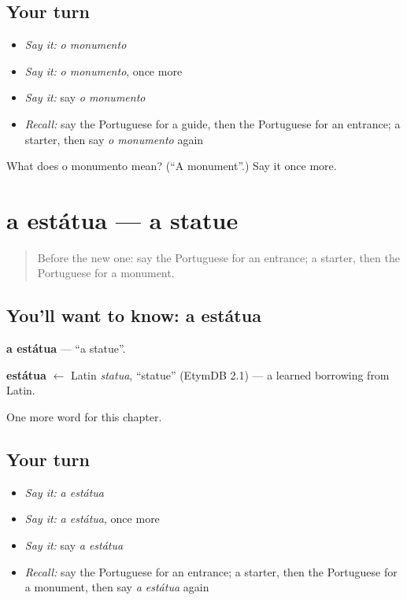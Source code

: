 \subsection*{Your turn}
\begin{itemize}
\raggedright
  \item \emph{Say it:} \emph{o monumento}
  \item \emph{Say it:} \emph{o monumento}, once more
  \item \emph{Say it:} say \emph{o monumento}
  \item \emph{Recall:} say the Portuguese for a guide, then the Portuguese for an entrance; a starter, then say \emph{o monumento} again
\end{itemize}

\begin{tcolorbox}[breakable,colback=teal!4,colframe=teal!35!black,title={Before you move on}]
What does o monumento mean? (\textquotedblleft{}A monument\textquotedblright{}.) Say it once more.
\end{tcolorbox}
\section[a estátua]{a estátua — a statue}

\label{lesson:PT-C194-estatua}



\begin{quote}
Before the new one: say the Portuguese for an entrance; a starter, then the Portuguese for a monument.
\end{quote}

\subsection*{You'll want to know: a estátua}
\textbf{a estátua} — \textquotedblleft{}a statue\textquotedblright{}.

\begin{cousinweb}
\textbf{estátua} $\leftarrow$ Latin \emph{statua}, \textquotedblleft{}statue\textquotedblright{} (EtymDB 2.1) — a learned borrowing from Latin.
\end{cousinweb}

\begin{grammarlens}[title={What you've built}]
One more word for this chapter.
\end{grammarlens}

\subsection*{Your turn}
\begin{itemize}
\raggedright
  \item \emph{Say it:} \emph{a estátua}
  \item \emph{Say it:} \emph{a estátua}, once more
  \item \emph{Say it:} say \emph{a estátua}
  \item \emph{Recall:} say the Portuguese for an entrance; a starter, then the Portuguese for a monument, then say \emph{a estátua} again
\end{itemize}

